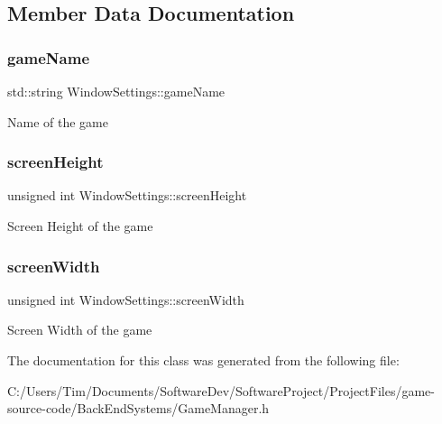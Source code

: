 \subsection{Member Data Documentation}
\mbox{\label{struct_window_settings_a32c14bbed2528fb85dad16f4c51facba}} 
\subsubsection{\texorpdfstring{game\+Name}{gameName}}
{\footnotesize\ttfamily std\+::string Window\+Settings\+::game\+Name}

Name of the game \mbox{\label{struct_window_settings_a7a55e4202ec4cf5a902705378aaeba05}} 
\subsubsection{\texorpdfstring{screen\+Height}{screenHeight}}
{\footnotesize\ttfamily unsigned int Window\+Settings\+::screen\+Height}

Screen Height of the game \mbox{\label{struct_window_settings_a92700db968541f97969b92c619387632}} 
\subsubsection{\texorpdfstring{screen\+Width}{screenWidth}}
{\footnotesize\ttfamily unsigned int Window\+Settings\+::screen\+Width}

Screen Width of the game 

The documentation for this class was generated from the following file\+:\begin{DoxyCompactItemize}
\item 
C\+:/\+Users/\+Tim/\+Documents/\+Software\+Dev/\+Software\+Project/\+Project\+Files/game-\/source-\/code/\+Back\+End\+Systems/Game\+Manager.\+h\end{DoxyCompactItemize}
